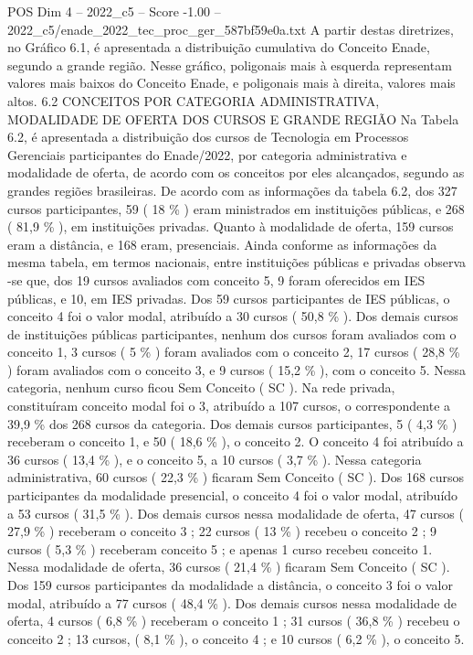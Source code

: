 \begin{textsample}{POS Dim 4 – 2022\_c5 – Score -1.00 – 2022\_c5/enade\_2022\_tec\_proc\_ger\_587bf59e0a.txt}
A partir destas diretrizes, no Gráfico 6.1, é apresentada a distribuição cumulativa do Conceito Enade, segundo a grande região.
Nesse gráfico, poligonais mais à esquerda representam valores mais baixos do Conceito Enade, e poligonais mais à direita, valores mais altos. 6.2 CONCEITOS POR CATEGORIA ADMINISTRATIVA, MODALIDADE DE OFERTA DOS CURSOS E GRANDE REGIÃO Na Tabela 6.2, é apresentada a distribuição dos cursos de Tecnologia em Processos Gerenciais participantes do Enade/2022, por categoria administrativa e modalidade de oferta, de acordo com os conceitos por eles alcançados, segundo as grandes regiões brasileiras.
De acordo com as informações da tabela 6.2, dos 327 cursos participantes, 59 ( 18 \% ) eram ministrados em instituições públicas, e 268 ( 81,9 \% ), em instituições privadas.
Quanto à modalidade de oferta, 159 cursos eram a distância, e 168 eram, presenciais.
Ainda conforme as informações da mesma tabela, em termos nacionais, entre instituições públicas e privadas observa -se que, dos 19 cursos avaliados com conceito 5, 9 foram oferecidos em IES públicas, e 10, em IES privadas.
Dos 59 cursos participantes de IES públicas, o conceito 4 foi o valor modal, atribuído a 30 cursos ( 50,8 \% ).
Dos demais cursos de instituições públicas participantes, nenhum dos cursos foram avaliados com o conceito 1, 3 cursos ( 5 \% ) foram avaliados com o conceito 2, 17 cursos ( 28,8 \% ) foram avaliados com o conceito 3, e 9 cursos ( 15,2 \% ), com o conceito 5.
Nessa categoria, nenhum curso ficou Sem Conceito ( SC ).
Na rede privada, constituíram conceito modal foi o 3, atribuído a 107 cursos, o correspondente a 39,9 \% dos 268 cursos da categoria.
Dos demais cursos participantes, 5 ( 4,3 \% ) receberam o conceito 1, e 50 ( 18,6 \% ), o conceito 2.
O conceito 4 foi atribuído a 36 cursos ( 13,4 \% ), e o conceito 5, a 10 cursos ( 3,7 \% ).
Nessa categoria administrativa, 60 cursos ( 22,3 \% ) ficaram Sem Conceito ( SC ).
Dos 168 cursos participantes da modalidade presencial, o conceito 4 foi o valor modal, atribuído a 53 cursos ( 31,5 \% ).
Dos demais cursos nessa modalidade de oferta, 47 cursos ( 27,9 \% ) receberam o conceito 3 ; 22 cursos ( 13 \% ) recebeu o conceito 2 ; 9 cursos ( 5,3 \% ) receberam conceito 5 ; e apenas 1 curso recebeu conceito 1.
Nessa modalidade de oferta, 36 cursos ( 21,4 \% ) ficaram Sem Conceito ( SC ).
Dos 159 cursos participantes da modalidade a distância, o conceito 3 foi o valor modal, atribuído a 77 cursos ( 48,4 \% ).
Dos demais cursos nessa modalidade de oferta, 4 cursos ( 6,8 \% ) receberam o conceito 1 ; 31 cursos ( 36,8 \% ) recebeu o conceito 2 ; 13 cursos, ( 8,1 \% ), o conceito 4 ; e 10 cursos ( 6,2 \% ), o conceito 5.

\end{textsample}
